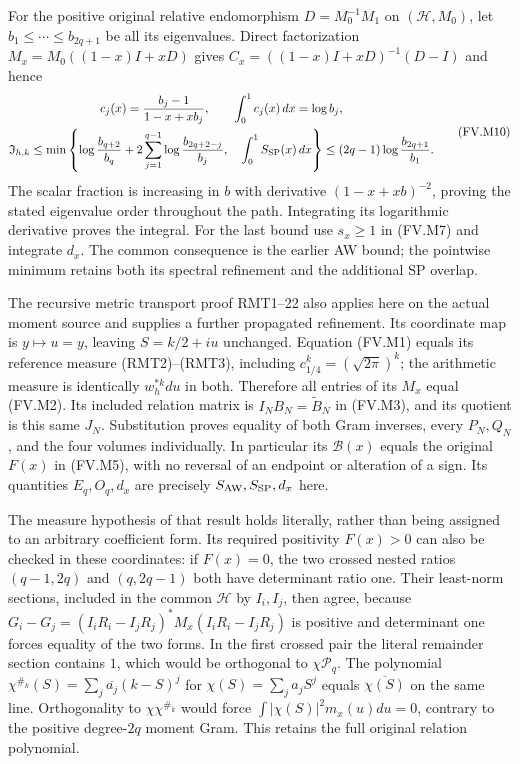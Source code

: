 For the positive original relative endomorphism $D=M_0^{-1}M_1$
on $(\mathcal H,M_0)$, let $b_1\le\cdots\le b_{2q+1}$ be all
its eigenvalues. Direct factorization
$M_x=M_0((1-x)I+xD)$ gives
$C_x=((1-x)I+xD)^{-1}(D-I)$ and hence
\[
 \begin{gathered}
 c_j(x)=\frac{b_j-1}{1-x+xb_j},\qquad
 \int_0^1c_j(x)\,dx=\log b_j,\\
 \mathfrak I_{h,k}\le
 \min\left\{\log\frac{b_{q+2}}{b_q}
     +2\sum_{j=1}^{q-1}\log\frac{b_{2q+2-j}}{b_j},\quad
                    \int_0^1S_{\rm SP}(x)\,dx\right\}
 \le(2q-1)\log\frac{b_{2q+1}}{b_1}.
 \end{gathered}\tag{FV.M10}\label{fvmetric:eigenvalues}
\]
The scalar fraction is increasing in $b$ with derivative
$(1-x+xb)^{-2}$, proving the stated eigenvalue order throughout the
path. Integrating its logarithmic derivative proves the integral.
For the last bound use $s_x\ge1$ in (FV.M7) and integrate $d_x$.
The common consequence is the earlier AW bound; the pointwise minimum
retains both its spectral refinement and the additional SP overlap.

The recursive metric transport proof RMT1--22 also applies here on the
actual moment source and supplies a further propagated refinement.
Its coordinate map is $y\mapsto u=y$, leaving $S=k/2+iu$ unchanged.
Equation (FV.M1) equals its reference measure (RMT2)--(RMT3), including
$c_{1/4}^k=(\sqrt{2\pi})^k$; the arithmetic measure is identically
$w_h^{*k}du$ in both. Therefore all entries of its $M_x$ equal (FV.M2).
Its included relation matrix is $I_NB_N=\widetilde B_N$ in (FV.M3),
and its quotient is this same $J_N$. Substitution proves equality of
both Gram inverses, every $P_N,Q_N$, and the four volumes individually.
In particular its $\mathcal B(x)$ equals the original $F(x)$ in (FV.M5),
with no reversal of an endpoint or alteration of a sign. Its quantities
$E_q,O_q,d_x$ are precisely $S_{\rm AW},S_{\rm SP},d_x$ here.

The measure hypothesis of that result holds literally, rather than being
assigned to an arbitrary coefficient form. Its required positivity
$F(x)>0$ can also be checked in these coordinates: if $F(x)=0$,
the two crossed nested ratios $(q-1,2q)$ and $(q,2q-1)$ both have
determinant ratio one. Their least-norm sections, included in the common
$\mathcal H$ by $I_i,I_j$, then agree, because
$G_i-G_j=(I_iR_i-I_jR_j)^*M_x(I_iR_i-I_jR_j)$ is positive and determinant one
forces equality of the two forms. In the first crossed pair the literal
remainder section contains $1$, which would be orthogonal to
$\chi\mathcal P_q$. The polynomial
$\chi^{\#_k}(S)=\sum_j\overline{a_j}(k-S)^j$ for
$\chi(S)=\sum_j a_jS^j$ equals $\overline{\chi(S)}$ on the same
line. Orthogonality to $\chi\chi^{\#_k}$ would force
$\int|\chi(S)|^2m_x(u)du=0$, contrary to the positive degree-$2q$
moment Gram. This retains the full original relation polynomial.

